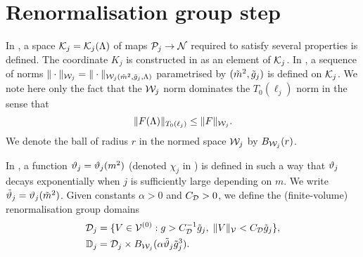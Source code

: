 
\section{Renormalisation group step}
\label{sec:step}

In \cite[Definition~\ref{step-def:Kspace}]{BS-rg-step},
a space $\mathcal{K}_j = \mathcal{K}_j(\Lambda)$ of maps $\mathcal{P}_j \rightarrow \mathcal{N}$ required to satisfy
several properties is defined.
The coordinate $K_j$ is constructed in \cite{BS-rg-step} as an element of $\mathcal{K}_j$.
In \cite[Section~\ref{step-sec:Knorms}]{BS-rg-step},
a sequence of norms $\|\cdot\|_{\mathcal{W}_j} = \|\cdot\|_{\mathcal{W}_j(\tilde{m}^2, \tilde{g}_j, \Lambda)}$
parametrised by $(\tilde{m}^2, \tilde{g}_j)$ is defined on $\mathcal{K}_j$.
We note here only the fact that the $\mathcal{W}_j$ norm dominates the $T_0(\ell_j)$ norm
in the sense that
\begin{equation}
\label{e:T0dom}
\|F(\Lambda)\|_{T_0(\ell_j)} \le \|F\|_{\mathcal{W}_j}.
\end{equation}
We denote the ball of radius $r$ in the normed space $\mathcal{W}_j$ by $B_{\mathcal{W}_j}(r)$.

In \cite[\eqref{log-e:mass-scale}--\eqref{log-e:chidef}]{BBS-saw4-log},
a function $\vartheta_j = \vartheta_j(m^2)$ (denoted $\chi_j$ in \cite{BBS-saw4-log})
is defined in such a way that $\vartheta_j$ decays exponentially
when $j$ is sufficiently large depending on $m$.
We write $\tilde{\vartheta}_j = \vartheta_j(\tilde{m}^2)$.
Given constants $\alpha > 0$ and $C_{\mathcal{D}} > 0$,
we define the (finite-volume)
renormalisation group domains
\begin{align}
\label{e:DVdef}
\mathcal{D}_j
	&=
\{ V\in \mathcal{V}^{(0)} :
	g> C_{\mathcal{D}}^{-1} \tilde{g}_j  , \;  \|V\|_{\mathcal{V}} < C_{\mathcal{D}} \tilde{g}_j \}, \\
\label{e:domRG}
\mathbb{D}_j
	&=
\mathcal{D}_j \times B_{\mathcal{W}_j}(\alpha \tilde{\vartheta}_j \tilde{g}_j^3).
\end{align}

